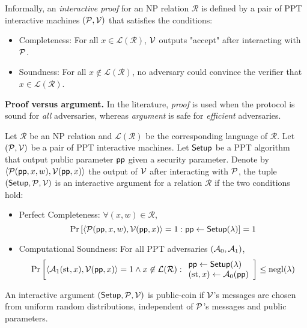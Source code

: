 Informally, an \textit{interactive proof} for an NP relation $\mathcal{R}$ is defined by a pair of PPT interactive machines $(\mathcal{P}, \mathcal{V})$ that satisfies the conditions:
\begin{itemize}
    \item Completeness: For all $x \in \mathcal{L}(\mathcal{R})$, $\mathcal{V}$ outputs "accept" after interacting with $\mathcal{P}$.
    \item Soundness: For all $x \not\in \mathcal{L}(\mathcal{R})$, no adversary could convince the verifier that $x \in \mathcal{L}(\mathcal{R})$.
\end{itemize}

\textbf{Proof versus argument.} In the literature, \textit{proof} is used when the protocol is sound for \textit{all} adversaries, 
whereas \textit{argument} is safe for \textit{efficient} adversaries.

\begin{definition}
\label{intarctive-argument}
Let $\mathcal{R}$ be an NP relation and $\mathcal{L}(\mathcal{R})$ be the corresponding language of $\mathcal{R}$.
Let $(\mathcal{P}, \mathcal{V})$ be a pair of PPT interactive machines. Let $\mathsf{Setup}$ be a PPT algorithm that output public parameter $\mathsf{pp}$ given a security parameter.
Denote by $\langle \mathcal{P}(\mathsf{pp}, x, w), \mathcal{V}(\mathsf{pp}, x) \rangle$ the output of $\mathcal{V}$ after interacting with $\mathcal{P}$, the tuple $(\mathsf{Setup}, \mathcal{P}, \mathcal{V})$ is an \textup{interactive argument} for a relation $\mathcal{R}$ if the two conditions hold:
\begin{itemize}
    \item \textup{Perfect Completeness:} $\forall (x, w) \in \mathcal{R}$, $$\mathrm{Pr} \left[ \langle \mathcal{P}(\mathsf{pp}, x, w), \mathcal{V}(\mathsf{pp}, x) \rangle = 1 : \mathsf{pp} \gets \mathsf{Setup}(\lambda) \right] = 1$$
    \item \textup{Computational Soundness:} For all PPT adversaries $(\mathcal{A}_0, \mathcal{A}_1)$,
    \begin{align*}
    \mathrm{Pr} \left[ 
    \langle \mathcal{A}_1(\mathrm{st}, x), \mathcal{V}(\mathsf{pp}, x) \rangle = 1 \wedge x \not\in \mathcal{L}(\mathcal{R}) : \begin{array}{l}
         \mathsf{pp} \gets \mathsf{Setup}(\lambda) \\
         (\mathrm{st}, x) \gets \mathcal{A}_0(\mathsf{pp})
    \end{array}
     \right] \le \mathrm{negl}(\lambda)    
    \end{align*}
\end{itemize}
\end{definition}

\begin{definition} An interactive argument $(\mathsf{Setup}, \mathcal{P}, \mathcal{V})$ is public-coin if $\mathcal{V}$'s messages are chosen from uniform random distributions, independent of $\mathcal{P}$'s messages and public parameters.
\end{definition}

